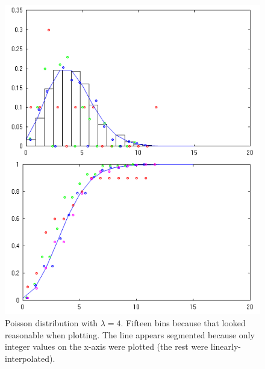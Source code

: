 \documentclass[letterpaper]{article}
\begin{document}
\begin{figure}[ht]
  \centering
  \includegraphics[width=\columnwidth]{2015-11-11_poisson.png}
  \caption{\label{fig:dPoiss} Poisson distribution with $\lambda=4$.  Fifteen
    bins because that looked reasonable when plotting.  The line appears
    segmented because only integer values on the x-axis were plotted (the rest
    were linearly-interpolated).}
\end{figure}
\end{document}
